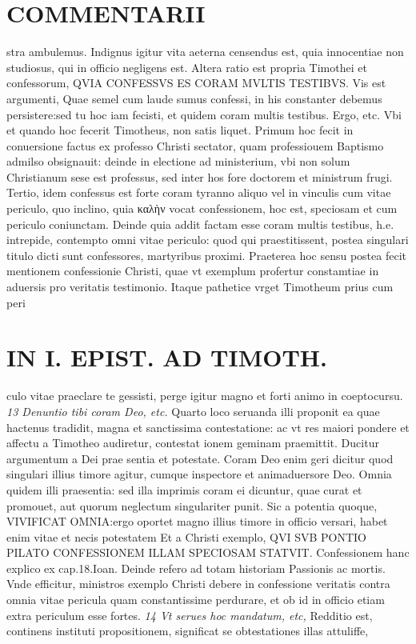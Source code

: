 \documentclass{article}
\begin{document}
\begin{pages}
\section*{COMMENTARII }
\marginpar{[ p.162 ]}\pstart stra ambulemus. Indignus igitur vita aeterna censendus est, quia innocentiae non studiosus, qui in officio negligens est.  \pend\pstart Altera ratio est propria Timothei et confessorum, QVIA CONFESSVS ES CORAM MVLTIS TESTIBVS. Vis est argumenti, Quae semel cum laude sumus confessi, in his constanter debemus persistere:sed tu hoc iam fecisti, et quidem coram multis testibus. Ergo, etc. Vbi et quando hoc fecerit Timotheus, non satis liquet. Primum hoc fecit in conuersione factus ex professo Christi sectator, quam professiouem Baptismo admilso obsignauit: deinde in electione ad ministerium, vbi non solum Christianum sese est professus, sed inter hos fore doctorem et ministrum frugi. Tertio, idem confessus est forte coram tyranno aliquo vel in vinculis cum vitae periculo, quo inclino, quia καλὴν vocat confessionem, hoc est, speciosam et cum periculo coniunctam. Deinde quia addit factam esse coram multis testibus, h.e. intrepide, contempto omni vitae periculo: quod qui praestitissent, postea singulari titulo dicti sunt confessores, martyribus proximi. Praeterea hoc sensu postea fecit mentionem confessionie Christi, quae vt exemplum profertur constamtiae in aduersis pro veritatis testimonio. Itaque pathetice vrget Timotheum prius cum peri\pend
\section*{IN I. EPIST. AD TIMOTH. }
\marginpar{[ p.163 ]}\pstart culo vitae praeclare te gessisti, perge igitur magno et forti animo in coeptocursu.  \pend
\textit{13 Denuntio tibi coram Deo, etc. }\pstart Quarto loco seruanda illi proponit ea quae hactenus tradidit, magna et sanctissima contestatione: ac vt res maiori pondere et affectu a Timotheo audiretur, contestat ionem geminam praemittit. Ducitur argumentum a Dei prae sentia et potestate.  \pend\pstart Coram Deo enim geri dicitur quod singulari illius timore agitur, cumque inspectore et animaduersore Deo. Omnia quidem illi praesentia: sed illa imprimis coram ei dicuntur, quae curat et promouet, aut quorum neglectum singulariter punit. Sic a potentia quoque, VIVIFICAT OMNIA:ergo oportet magno illius timore in officio versari, habet enim vitae et necis potestatem Et a Christi exemplo, QVI SVB PONTIO PILATO CONFESSIONEM ILLAM SPECIOSAM STATVIT. Confessionem hanc explico ex cap.18.Ioan. Deinde refero ad totam historiam Passionis ac mortis. Vnde efficitur, ministros exemplo Christi debere in confessione veritatis contra omnia vitae pericula quam constantissime perdurare, et ob id in officio etiam extra periculum esse fortes.  \pend
\textit{14 Vt serues hoc mandatum, etc, }\pstart Redditio est, continens instituti propositionem, significat se obtestationes illas attuliffe,  \pend

\end{pages}
\end{document}
